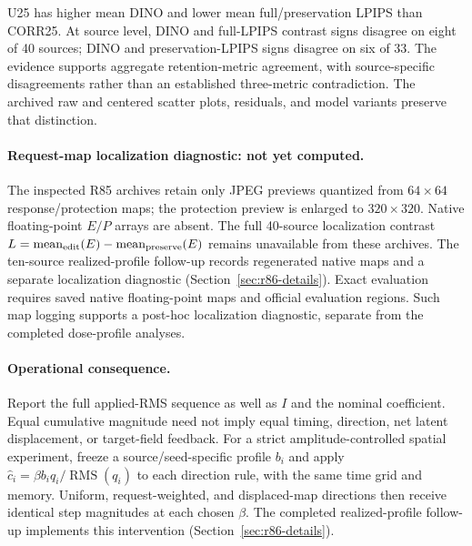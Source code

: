 U25 has higher mean DINO and lower mean full/preservation LPIPS than CORR25. At source level, DINO and full-LPIPS contrast signs disagree on eight of 40 sources; DINO and preservation-LPIPS signs disagree on six of 33. The evidence supports aggregate retention-metric agreement, with source-specific disagreements rather than an established three-metric contradiction. The archived raw and centered scatter plots, residuals, and model variants preserve that distinction.

\paragraph{Request-map localization diagnostic: not yet computed.}
The inspected R85 archives retain only JPEG previews quantized from $64\times64$ response/protection maps; the protection preview is enlarged to $320\times320$. Native floating-point $E/P$ arrays are absent. The full 40-source localization contrast $L=\operatorname{mean}_{\rm edit}(E)-\operatorname{mean}_{\rm preserve}(E)$ remains unavailable from these archives. The ten-source realized-profile follow-up records regenerated native maps and a separate localization diagnostic (Section~\ref{sec:r86-details}). Exact evaluation requires saved native floating-point maps and official evaluation regions. Such map logging supports a post-hoc localization diagnostic, separate from the completed dose-profile analyses.

\paragraph{Operational consequence.}
Report the full applied-RMS sequence as well as $I$ and the nominal coefficient. Equal cumulative magnitude need not imply equal timing, direction, net latent displacement, or target-field feedback. For a strict amplitude-controlled spatial experiment, freeze a source/seed-specific profile $b_i$ and apply $\widehat c_i=\beta b_iq_i/\operatorname{RMS}(q_i)$ to each direction rule, with the same time grid and memory. Uniform, request-weighted, and displaced-map directions then receive identical step magnitudes at each chosen $\beta$. The completed realized-profile follow-up implements this intervention (Section~\ref{sec:r86-details}).

